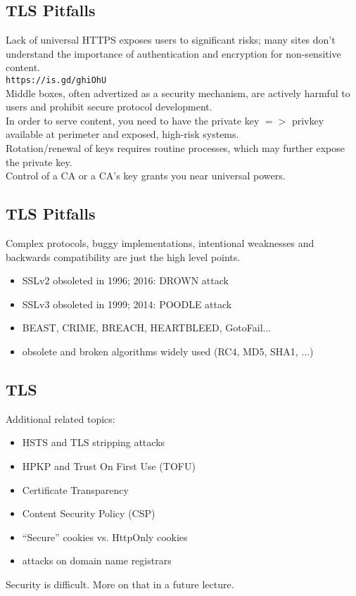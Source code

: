 \documentclass[xga]{xdvislides}
\begin{document}
\subsection{TLS Pitfalls}
Lack of universal HTTPS exposes users to significant
risks; many sites don't understand the importance of
authentication and encryption for non-sensitive content. \\

\verb+https://is.gd/ghiOhU+ \\

Middle boxes, often advertized as a security
mechanism, are actively harmful to users and prohibit
secure protocol development. \\

In order to serve content, you need to have the
private key $ => $ privkey available at perimeter and
exposed, high-risk systems. \\

Rotation/renewal of keys requires routine processes,
which may further expose the private key. \\

Control of a CA or a CA's key grants you near
universal powers. \\


\subsection{TLS Pitfalls}
Complex protocols, buggy implementations, intentional
weaknesses and backwards compatibility are just the
high level points.

\begin{itemize}
	\item SSLv2 obsoleted in 1996; 2016: DROWN attack
	\item SSLv3 obsoleted in 1999; 2014: POODLE attack
	\item BEAST, CRIME, BREACH, HEARTBLEED, GotoFail...
	\item obsolete and broken algorithms widely used (RC4, MD5, SHA1, ...)
\end{itemize}

\subsection{TLS}
Additional related topics:
\begin{itemize}
	\item HSTS and TLS stripping attacks
	\item HPKP and Trust On First Use (TOFU)
	\item Certificate Transparency
	\item Content Security Policy (CSP)
	\item ``Secure'' cookies vs. HttpOnly cookies
	\item attacks on domain name registrars
\end{itemize}
\addvspace{.5in}
Security is difficult.  More on that in a future
lecture.
\end{document}
